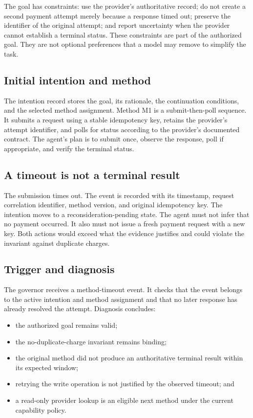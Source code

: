 The goal has constraints: use the provider's authoritative record; do not create a second payment attempt merely because a response timed out; preserve the identifier of the original attempt; and report uncertainty when the provider cannot establish a terminal status. These constraints are part of the authorized goal. They are not optional preferences that a model may remove to simplify the task.

\subsection{Initial intention and method}

The intention record stores the goal, its rationale, the continuation conditions, and the selected method assignment. Method M1 is a submit-then-poll sequence. It submits a request using a stable idempotency key, retains the provider's attempt identifier, and polls for status according to the provider's documented contract. The agent's plan is to submit once, observe the response, poll if appropriate, and verify the terminal status.

\subsection{A timeout is not a terminal result}

The submission times out. The event is recorded with its timestamp, request correlation identifier, method version, and original idempotency key. The intention moves to a reconsideration-pending state. The agent must not infer that no payment occurred. It also must not issue a fresh payment request with a new key. Both actions would exceed what the evidence justifies and could violate the invariant against duplicate charges.

\subsection{Trigger and diagnosis}

The governor receives a method-timeout event. It checks that the event belongs to the active intention and method assignment and that no later response has already resolved the attempt. Diagnosis concludes:

\begin{itemize}
  \item the authorized goal remains valid;
  \item the no-duplicate-charge invariant remains binding;
  \item the original method did not produce an authoritative terminal result within its expected window;
  \item retrying the write operation is not justified by the observed timeout; and
  \item a read-only provider lookup is an eligible next method under the current capability policy.
\end{itemize}

